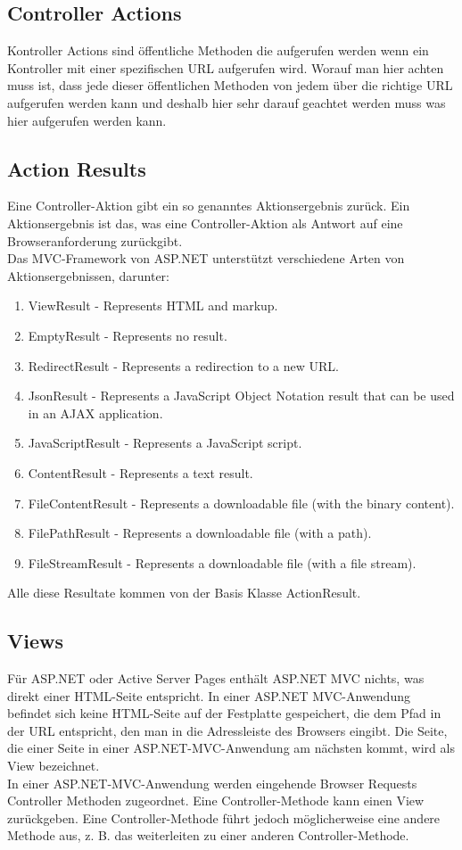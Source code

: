 {\subsection{Controller Actions}
\label{sec:controller_actions}
Kontroller Actions sind öffentliche Methoden die aufgerufen werden wenn ein Kontroller mit einer spezifischen URL aufgerufen wird. Worauf man hier achten muss ist, dass jede dieser öffentlichen Methoden von jedem über die richtige URL aufgerufen werden kann und deshalb hier sehr darauf geachtet werden muss was hier aufgerufen werden kann. 
\subsection{Action Results}
\label{sec:controller_actions_results}
Eine Controller-Aktion gibt ein so genanntes Aktionsergebnis zurück. Ein Aktionsergebnis ist das, was eine Controller-Aktion als Antwort auf eine Browseranforderung zurückgibt.\\Das MVC-Framework von ASP.NET unterstützt verschiedene Arten von Aktionsergebnissen, darunter:
\begin{enumerate}
\item ViewResult - Represents HTML and markup.
\item EmptyResult - Represents no result.
\item RedirectResult - Represents a redirection to a new URL.
\item JsonResult - Represents a JavaScript Object Notation result that can be used in an AJAX application.
\item JavaScriptResult - Represents a JavaScript script.
\item ContentResult - Represents a text result.
\item FileContentResult - Represents a downloadable file (with the binary content).
\item FilePathResult - Represents a downloadable file (with a path).
\item FileStreamResult - Represents a downloadable file (with a file stream).
\end{enumerate}
Alle diese Resultate kommen von der Basis Klasse ActionResult.
\textcite{mic_controller}
\subsection{Views}
\label{sec:Views}
Für ASP.NET oder Active Server Pages enthält ASP.NET MVC nichts, was direkt einer HTML-Seite entspricht. In einer ASP.NET MVC-Anwendung befindet sich keine HTML-Seite auf der Festplatte gespeichert, die dem Pfad in der URL entspricht, den man in die Adressleiste des Browsers eingibt. Die Seite, die einer Seite in einer ASP.NET-MVC-Anwendung am nächsten kommt, wird als View bezeichnet.\\
In einer ASP.NET-MVC-Anwendung werden eingehende Browser Requests Controller Methoden zugeordnet. Eine Controller-Methode kann einen View zurückgeben. Eine Controller-Methode führt jedoch möglicherweise eine andere Methode aus, z. B. das weiterleiten zu einer anderen Controller-Methode.
}
